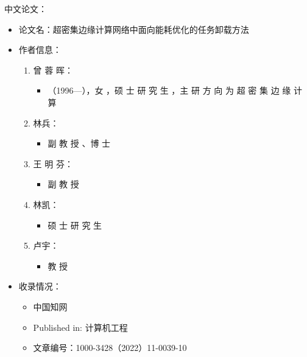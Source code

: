 中文论文：
\begin{itemize}
    \item 论文名：超密集边缘计算网络中面向能耗优化的任务卸载方法
    \item 作者信息：
        \begin{enumerate}
            \item 曾 蓉 晖：
                \begin{itemize}
                    \item （1996—），女 ，硕 士 研 究 生 ，主 研 方 向 为 超 密 集 边 缘 计 算
                \end{itemize}
            \item 林兵：
                \begin{itemize}
                    \item 副 教 授 、博 士
                \end{itemize}

            \item 王 明 芬：
                \begin{itemize}
                    \item 副 教 授
                \end{itemize}

            \item 林凯：
                \begin{itemize}
                    \item 硕 士 研 究 生
                \end{itemize}
            \item 卢宇：
                \begin{itemize}
                    \item 教 授
                \end{itemize}
        \end{enumerate}

    \item 收录情况：
        \begin{itemize}
            \item 中国知网
            \item Published in: 计算机工程
            \item 文章编号：1000-3428（2022）11-0039-10
        \end{itemize}


\end{itemize}
